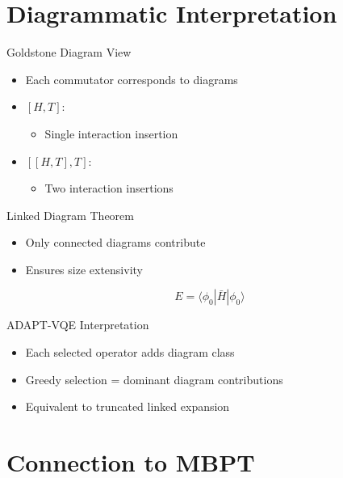\documentclass{beamer}
\begin{document}
\section{Diagrammatic Interpretation}

\begin{frame}{Goldstone Diagram View}
\begin{itemize}
\item Each commutator corresponds to diagrams
\item $[H,T]$:
\begin{itemize}
\item Single interaction insertion
\end{itemize}
\item $[[H,T],T]$:
\begin{itemize}
\item Two interaction insertions
\end{itemize}
\end{itemize}
\end{frame}


\begin{frame}{Linked Diagram Theorem}
\begin{itemize}
\item Only connected diagrams contribute
\item Ensures size extensivity
\end{itemize}

\[
E = \langle \phi_0 | \bar{H} | \phi_0 \rangle
\]
\end{frame}


\begin{frame}{ADAPT-VQE Interpretation}
\begin{itemize}
\item Each selected operator adds diagram class
\item Greedy selection = dominant diagram contributions
\item Equivalent to truncated linked expansion
\end{itemize}
\end{frame}

\section{Connection to MBPT}
\end{document}
